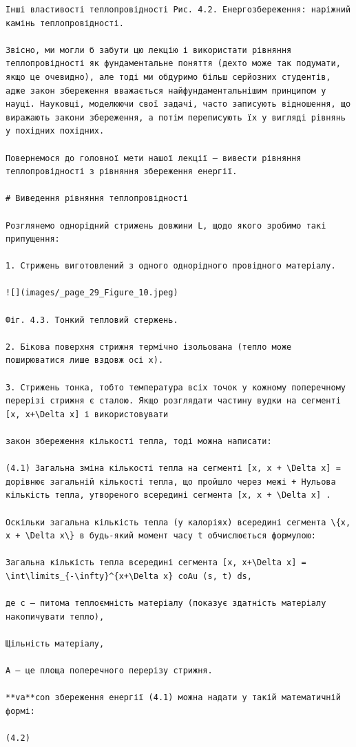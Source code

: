 \documentclass[
  ukrainian,
]{article}
\begin{document}
\begin{verbatim}
Інші властивості теплопровідності Рис. 4.2. Енергозбереження: наріжний камінь теплопровідності.

Звісно, ми могли б забути цю лекцію і використати рівняння теплопровідності як фундаментальне поняття (дехто може так подумати, якщо це очевидно), але тоді ми обдуримо більш серйозних студентів, адже закон збереження вважається найфундаментальнішим принципом у науці. Науковці, моделюючи свої задачі, часто записують відношення, що виражають закони збереження, а потім переписують їх у вигляді рівнянь у похідних похідних.

Повернемося до головної мети нашої лекції — вивести рівняння теплопровідності з рівняння збереження енергії.

# Виведення рівняння теплопровідності

Розглянемо однорідний стрижень довжини L, щодо якого зробимо такі припущення:

1. Стрижень виготовлений з одного однорідного провідного матеріалу.

![](images/_page_29_Figure_10.jpeg)

Фіг. 4.3. Тонкий тепловий стержень.

2. Бікова поверхня стрижня термічно ізольована (тепло може поширюватися лише вздовж осі x).

3. Стрижень тонка, тобто температура всіх точок у кожному поперечному перерізі стрижня є сталою. Якщо розглядати частину вудки на сегменті [x, x+\Delta x] і використовувати

закон збереження кількості тепла, тоді можна написати:

(4.1) Загальна зміна кількості тепла на сегменті [x, x + \Delta x] = дорівнює загальній кількості тепла, що пройшло через межі + Нульова кількість тепла, утвореного всередині сегмента [x, x + \Delta x] .

Оскільки загальна кількість тепла (у калоріях) всередині сегмента \{x, x + \Delta x\} в будь-який момент часу t обчислюється формулою:

Загальна кількість тепла всередині сегмента [x, x+\Delta x] = \int\limits_{-\infty}^{x+\Delta x} coAu (s, t) ds,

де c — питома теплоємність матеріалу (показує здатність матеріалу накопичувати тепло),

Щільність матеріалу,

A — це площа поперечного перерізу стрижня.

**va**con збереження енергії (4.1) можна надати у такій математичній формі:

(4.2)
\end{verbatim}
\end{document}
